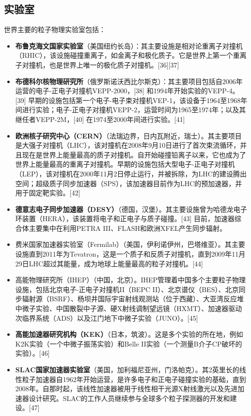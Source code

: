 \subsection{实验室}
世界主要的粒子物理实验室包括：
\begin{itemize}
\item \textbf{布鲁克海文国家实验室}（美国纽约长岛）：其主要设施是相对论重离子对撞机（RHIC），该设施碰撞重离子，如金离子和极化质子。它是世界上第一个重离子对撞机，也是世界上唯一的极化质子对撞机。[36][37]
\item \textbf{布德科尔核物理研究所}（俄罗斯诺沃西比尔斯克）：其主要项目包括自2006年运营的电子-正电子对撞机VEPP-2000，[38] 和1994年开始实验的VEPP-4。[39] 早期的设施包括第一个电子-电子束对撞机VEP-1，该设备于1964至1968年间进行实验；电子-正电子对撞机VEPP-2，运营时间为1965至1974年；以及其继任者VEPP-2M，[40] 在1974至2000年间进行实验。[41]
\item \textbf{欧洲核子研究中心（CERN）}（法瑞边界，日内瓦附近，瑞士）。其主要项目是大强子对撞机（LHC），该对撞机在2008年9月10日进行了首次束流循环，并且现在是世界上能量最高的质子对撞机。自开始碰撞铅离子以来，它也成为了世界上能量最高的重离子对撞机。早期的设施包括大型电子-正电子对撞机（LEP），该对撞机在2000年11月2日停止运行，并被拆除，为LHC的建设腾出空间；超级质子同步加速器（SPS），该加速器目前作为LHC的预加速器，并用于固定靶实验。[42]
\item \textbf{德意志电子同步加速器（DESY）}（德国，汉堡）。其主要设施曾为哈德龙电子环装置（HERA），该装置将电子和正电子与质子碰撞。[43] 目前，加速器综合体主要集中在利用PETRA III、FLASH和欧洲XFEL产生同步辐射。
\item 费米国家加速器实验室（Fermilab）（美国，伊利诺伊州，巴塔维亚）。其主要设施直到2011年为Tevatron，这是一个质子和反质子对撞机，直到2009年11月29日LHC超过其能量，成为地球上能量最高的粒子对撞机。[44]
\item 高能物理研究所（IHEP）（中国，北京）。IHEP管理着中国多个主要粒子物理设施，包括北京电子-正电子对撞机II（BEPC II）、北京谱仪（BES）、北京同步辐射源（BSRF）、杨坝井国际宇宙射线观测站（位于西藏）、大亚湾反应堆中微子实验、中国散裂中子源、硬X射线调制望远镜（HXMT）、加速器驱动次临界系统（ADS）以及江门地下中微子实验（JUNO）。[45]
\item \textbf{高能加速器研究机构（KEK）}（日本，筑波）。这是多个实验的所在地，例如K2K实验（一个中微子振荡实验）和Belle II实验（一个测量B介子CP破坏的实验）。[46]
\item \textbf{SLAC国家加速器实验室}（美国，加利福尼亚州，门洛帕克）。其2英里长的线性粒子加速器自1962年开始运营，是许多电子和正电子碰撞实验的基础，直到2008年。自那时起，该线性加速器被用于线性相干光源X射线激光以及先进加速器设计研究。SLAC的工作人员继续参与全球多个粒子探测器的开发和建设。[47]
\end{itemize}

